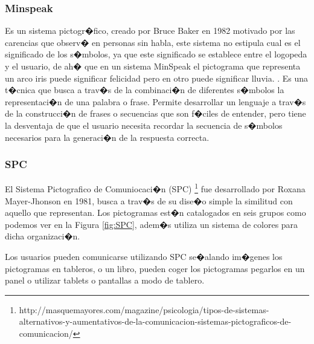 \subsubsection{Minspeak}

Es un sistema pictogr�fico, creado por Bruce Baker en 1982 motivado por las carencias que observ� en personas sin habla, este sistema no estipula cual es el significado de los s�mbolos, ya que este significado se establece entre el logopeda y el usuario, de ah� que en un sistema MinSpeak el pictograma que representa un arco iris puede significar felicidad pero en otro puede significar lluvia. \citep{MartinGuerrero2018}. Es una t�cnica que busca a trav�s de la combinaci�n de diferentes s�mbolos la representaci�n de una palabra o frase. 
Permite desarrollar un lenguaje a trav�s de la construcci�n de frases o secuencias que son f�ciles de entender, pero tiene la desventaja de que el usuario necesita recordar la secuencia de s�mbolos necesarios para la generaci�n de la respuesta correcta.


\subsubsection{SPC}

El Sistema Pictografico de Comuniocaci�n (SPC)
\footnote{http://masquemayores.com/magazine/psicologia/tipos-de-sistemas-alternativos-y-aumentativos-de-la-comunicacion-sistemas-pictograficos-de-comunicacion/} fue desarrollado por Roxana Mayer-Jhonson en 1981, busca a trav�s de su dise�o simple la similitud con aquello que representan. Los pictogramas est�n catalogados en seis grupos como podemos ver en la Figura \ref{fig:SPC}, adem�s utiliza un sistema de colores para dicha organizaci�n.


Los usuarios pueden comunicarse utilizando SPC se�alando im�genes los pictogramas en tableros, o un libro, pueden coger los pictogramas pegarlos en un panel o utilizar tablets o pantallas a modo de tablero.

